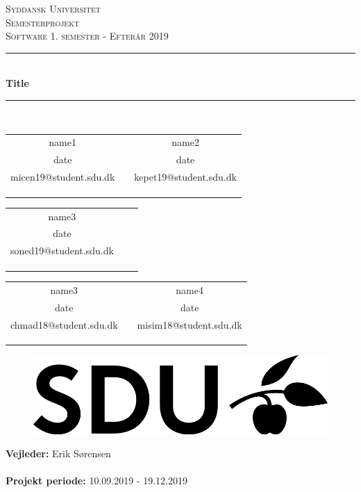 \documentclass[report.tex]{subfiles}
\begin{document}
\begin{titlepage}
\begin{center}
\textsc{\LARGE Syddansk Universitet }\\[1.5cm]

\textsc{Semesterprojekt}\\[0.5cm]

\textsc{\large Software 1. semester - Efterår 2019}\\[0.5cm]
\rule{\linewidth}{0.5mm}\\[0.4cm]
{ \LARGE \bfseries Title \\[0.4cm]}
\rule{\linewidth}{0.5mm}\\[1.2cm]

\begin{tabular}{c c c}
	name1     &   & name2\\ 
	date                  &   & date \\
	micen19@student.sdu.dk  &   & kepet19@student.sdu.dk \\
    \\ \\
        	\cline{1-1}\cline{3-3}

        	\\
\end{tabular}
\begin{tabular}{c c c} 
	name3     &   & \\ 
	date                  &   & \\
	soned19@student.sdu.dk  &   &  \\
    \\ \\
        	\cline{1-1}

        	\\
\end{tabular}
\begin{tabular}{c c c} 
	name3     &   & name4\\ 
	date                  &   & date \\
	chmad18@student.sdu.dk  &   & misim18@student.sdu.dk \\
    \\ \\
        	\cline{1-1}\cline{3-3}

        	\\
\end{tabular}

\vfill
\begin{figure}[H]
\centering
\includegraphics[scale=0.8]{figures/SDU_BLACK_RGB_png.png}
\end{figure}
\vfill

\textbf{Vejleder:} Erik Sørensen \\ \mbox{}\\
\textbf{Projekt periode:} 10.09.2019 - 19.12.2019
\end{center}
\end{titlepage}
\end{document}
